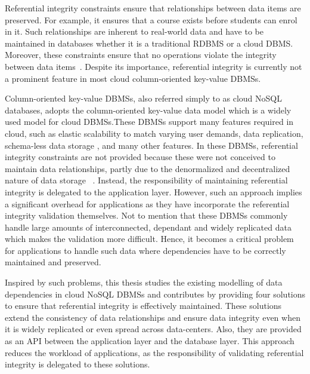    Referential integrity constraints  ensure that  relationships
   between data items are preserved. For example, it ensures that a course
   exists before students can enrol in it. Such relationships are 
   inherent to real-world data and have to be maintained in databases
   whether it is a traditional \ac{RDBMS} or a cloud \ac{DBMS}.
   Moreover, these constraints  ensure that no operations violate  the
   integrity between  data items~\citep{Navathe}.   Despite its
   importance, referential integrity is currently not a prominent feature in most  cloud
   column-oriented key-value \acp{DBMS}. 
   
   
   Column-oriented key-value \acp{DBMS}, also  referred simply to as cloud
   \ac{NoSQL} databases,  adopts the column-oriented key-value data model which
   is a widely used model for cloud \acp{DBMS}.These \acp{DBMS}  support many
   features required in cloud,  such as elastic scalability to match varying
   user demands, data replication,  schema-less data storage ,   and many other
   features. In these \acp{DBMS},  referential integrity constraints are not
   provided because these were not conceived to maintain data relationships,
   partly due to the denormalized and decentralized nature of data storage
   ~\citep{Navathe}.
   Instead, the responsibility of maintaining referential integrity is delegated
   to the application layer.
    However, such an approach implies a significant overhead for applications as
    they have incorporate the referential integrity validation themselves. Not
    to mention that these \acp{DBMS} commonly handle large amounts of
    interconnected, dependant and widely replicated data which makes the validation more
    difficult. Hence, it becomes a  critical problem for applications to handle
   such  data where dependencies have to be correctly maintained and preserved.
   
   
	Inspired by such problems, this thesis studies the existing
modelling of data dependencies in cloud \ac{NoSQL}  \acp{DBMS}  and contributes by
providing four solutions to ensure  that referential integrity is
effectively maintained. These solutions  extend the consistency of data
relationships and  ensure  data integrity even when it is widely replicated or
even spread across data-centers. Also, they are provided as an \ac{API} between
the application layer and the database layer. This approach reduces the
workload of applications, as the responsibility
of validating referential integrity is delegated to these solutions.
%    
%      
%    
%  
   

